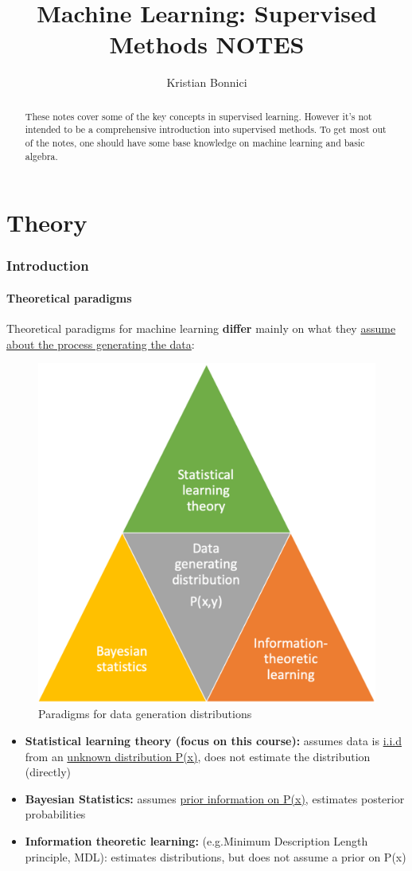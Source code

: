 \documentclass[12pt, a4paper]{article}
\title{Machine Learning: Supervised Methods
NOTES}
\author{Kristian Bonnici}
\let\stdsection\section
\renewcommand\section{\newpage\stdsection} %
\begin{document}
\maketitle
\tableofcontents

\begin{abstract}
These notes cover some of the key concepts in supervised learning. However it's not intended to be a comprehensive introduction into supervised methods. To get most out of the notes, one should have some base knowledge on machine learning and basic algebra.
\end{abstract}

\newpage
\part{Theory}
\newpage

\section{Introduction}

\subsection{Theoretical paradigms }\label{theoretical-paradigms}

Theoretical paradigms for machine learning \textbf{differ} mainly on
what they \uline{assume about the process generating the data}:

\begin{figure}[H]
  \centering  %
    \includegraphics[width=0.4\columnwidth]{images/theoretical-paradigms.png}
    \caption{Paradigms for data generation distributions}
    \label{fig:fig1}
\end{figure}

\begin{itemize}
\item
  \textbf{\textcolor[HTML]{7EAA55}{Statistical learning theory (focus on this course)}:} assumes
  data is \uline{i.i.d} from an \uline{unknown distribution P(x)}, does not estimate the
  distribution (directly)
\item
  \textbf{\textcolor[HTML]{F5C342}{Bayesian Statistics}:} assumes \uline{prior information on P(x)}, estimates posterior probabilities
\item
  \textbf{\textcolor[HTML]{DE8344}{Information theoretic learning}:} (e.g.Minimum Description Length principle, MDL):
  estimates distributions, but does not assume a prior on P(x)

\end{itemize}
\end{document}
